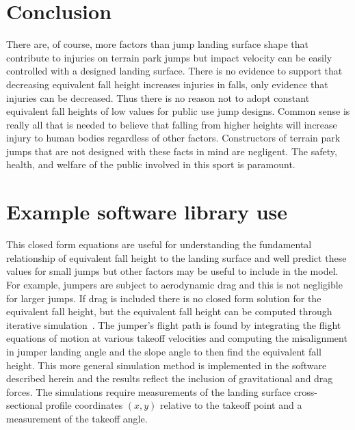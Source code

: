 \documentclass{article}
\begin{document}
\section{Conclusion}
%
There are, of course, more factors than jump landing surface shape that
contribute to injuries on terrain park jumps but impact velocity can be easily
controlled with a designed landing surface. There is no evidence to support
that decreasing equivalent fall height increases injuries in falls, only
evidence that injuries can be decreased. Thus there is no reason not to adopt
constant equivalent fall heights of low values for public use jump designs.
Common sense is really all that is needed to believe that falling from higher
heights will increase injury to human bodies regardless of other factors.
Constructors of terrain park jumps that are not designed with these facts in
mind are negligent. The safety, health, and welfare of the public involved in
this sport is paramount.





\appendix

\section{Example software library use}
%
This closed form equations are useful for understanding the fundamental
relationship of equivalent fall height to the landing surface and well predict
these values for small jumps but other factors may be useful to include in the
model. For example, jumpers are subject to aerodynamic drag and this is not
negligible for larger jumps. If drag is included there is no closed form
solution for the equivalent fall height, but the equivalent fall height can be
computed through iterative simulation~\cite{Levy2015}. The jumper's flight path
is found by integrating the flight equations of motion at various takeoff
velocities and computing the misalignment in jumper landing angle and the slope
angle to then find the equivalent fall height. This more general simulation
method is implemented in the software described herein and the results reflect
the inclusion of gravitational and drag forces. The simulations require
measurements of the landing surface cross-sectional profile coordinates $(x,y)$
relative to the takeoff point and a measurement of the takeoff angle.
\end{document}
